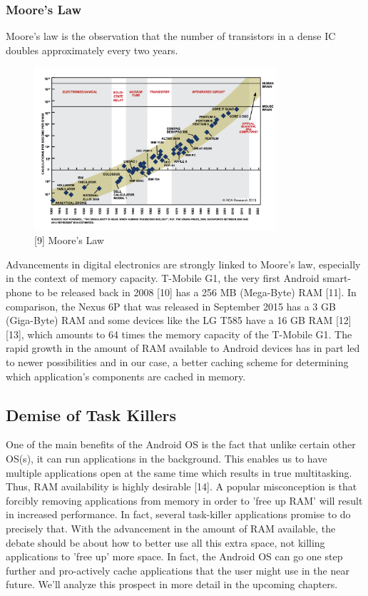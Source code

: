 \documentclass[12pt]{uthesis-v12}  %
\begin{document}
			\subsubsection{Moore's Law}
				Moore's law is the observation that the number of transistors in a dense IC doubles approximately every two years.
				
				\begin{figure}[h]
					\centering
					\includegraphics[width = 90mm]{images/mooresLaw.png}
					\caption[Moore's law]{[9] Moore's Law}
				\end{figure}
				
				Advancements in digital electronics are strongly linked to Moore's law, especially in the context of memory capacity. T-Mobile G1, the very first Android smart-phone to be released back in 2008 [10] has a 256 MB (Mega-Byte) RAM [11]. In comparison, the Nexus 6P that was released in September 2015 has a 3 GB (Giga-Byte) RAM and some devices like the LG T585 have a 16 GB RAM [12][13], which amounts to 64 times the memory capacity of the T-Mobile G1. The rapid growth in the amount of RAM available to Android devices has in part led to newer possibilities and in our case, a better caching scheme for determining which application's components are cached in memory.
			 	
		\subsection{Demise of Task Killers}
			One of the main benefits of the Android OS is the fact that unlike certain other OS(s), it can run applications in the background. This enables us to have multiple applications open at the same time which results in true multitasking. Thus, RAM availability is highly desirable [14]. A popular misconception is that forcibly removing applications from memory in order to 'free up RAM' will result in increased performance. In fact, several task-killer applications promise to do precisely that. With the advancement in the amount of RAM available, the debate should be about how to better use all this extra space, not killing applications to 'free up' more space. In fact, the Android OS can go one step further and pro-actively cache applications that the user might use in the near future. We'll analyze this prospect in more detail in the upcoming chapters.  
\end{document}
